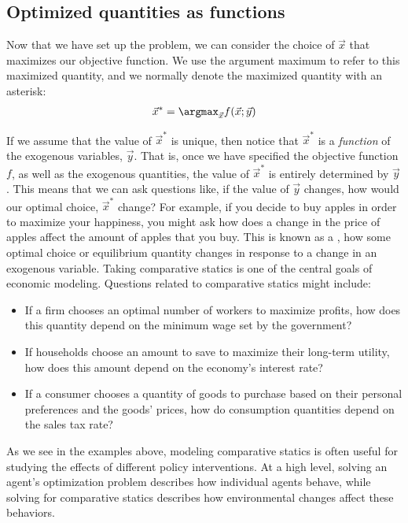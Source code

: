 \subsection*{Optimized quantities as functions}
Now that we have set up the problem, we can consider the choice of $\vec{x}$ that maximizes our objective function. We use the argument maximum to refer to this maximized quantity, and we normally denote the maximized quantity with an asterisk:
\begin{align*}
    \vec{x}^* = \argmax_{\vec{x}} f(\vec{x}; \vec{y})
\end{align*}

If we assume that the value of $\vec{x}^*$ is unique, then notice that $\vec{x}^*$ is a \emph{function} of the exogenous variables, $\vec{y}$. That is, once we have specified the objective function $f$, as well as the exogenous quantities, the value of $\vec{x}^*$ is entirely determined by $\vec{y}$. This means that we can ask questions like, if the value of $\vec{y}$ changes, how would our optimal choice, $\vec{x}^*$ change? For example, if you decide to buy apples in order to maximize your happiness, you might ask how does a change in the price of apples affect the amount of apples that you buy. This is known as a , how some optimal choice or equilibrium quantity changes in response to a change in an exogenous variable. Taking comparative statics is one of the central goals of economic modeling. Questions related to comparative statics might include:

\begin{itemize}
    \item If a firm chooses an optimal number of workers to maximize profits, how does this quantity depend on the minimum wage set by the government?
    \item If households choose an amount to save to maximize their long-term utility, how does this amount depend on the economy's interest rate?
    \item If a consumer chooses a quantity of goods to purchase based on their personal preferences and the goods' prices, how do consumption quantities depend on the sales tax rate? 
\end{itemize}
As we see in the examples above, modeling comparative statics is often useful for studying the effects of different policy interventions. At a high level, solving an agent's optimization problem describes how individual agents behave, while solving for comparative statics describes how environmental changes affect these behaviors.

